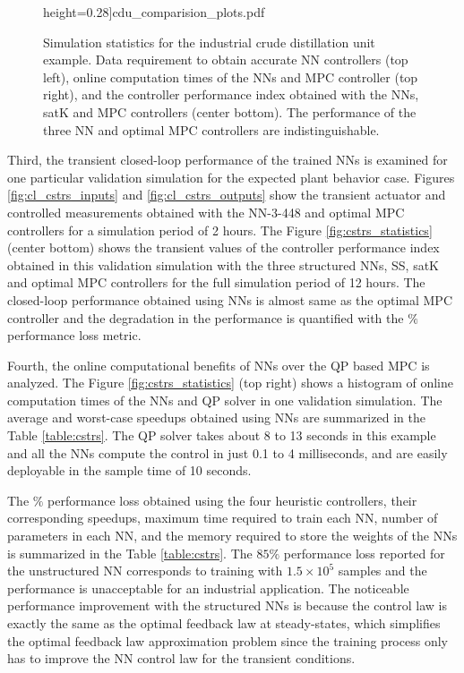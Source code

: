 \documentclass[preprint,5p, twocolumn, authoryear]{elsarticle}
\begin{document}
\begin{figure}[!h]
\begin{center}
        height=0.28\textheight]{cdu_comparision_plots.pdf}\end{center}
    \vspace{-0.2in}
    \caption{Simulation statistics for the industrial crude distillation unit
    example. Data requirement to obtain accurate NN controllers (top left),
    online computation times of the NNs and MPC controller (top right), and the
    controller performance index obtained with the NNs, satK and MPC controllers
    (center bottom). The performance of the three NN and optimal MPC controllers
    are indistinguishable.}	
    \label{fig:cdu_statistics}
\end{figure}

Third, the transient closed-loop performance of the trained NNs is examined for
one particular validation simulation for the expected plant behavior case.
Figures \ref{fig:cl_cstrs_inputs} and \ref{fig:cl_cstrs_outputs} show the
transient actuator and controlled measurements obtained with the NN-3-448 and
optimal MPC controllers for a simulation period of 2 hours. The Figure
\ref{fig:cstrs_statistics} (center bottom) shows the transient values of the
controller performance index obtained in this validation simulation with the
three structured NNs, SS, satK and optimal MPC controllers for the full
simulation period of 12 hours. The closed-loop performance obtained using NNs is
almost same as the optimal MPC controller and the degradation in the performance
is quantified with the $\%$ performance loss metric.

Fourth, the online computational benefits of NNs over the QP based MPC is
analyzed. The Figure \ref{fig:cstrs_statistics} (top right) shows a histogram of
online computation times of the NNs and QP solver in one validation simulation.
The average and worst-case speedups obtained using NNs are summarized in the
Table \ref{table:cstrs}. The QP solver takes about 8 to 13 seconds in this
example and all the NNs compute the control in just 0.1 to 4 milliseconds, and
are easily deployable in the sample time of 10 seconds.

The $\%$ performance loss obtained using the four heuristic controllers, their
corresponding speedups, maximum time required to train each NN, number of
parameters in each NN, and the memory required to store  
the weights of the NNs is summarized in the Table \ref{table:cstrs}. The $85 \%$
performance loss reported for the unstructured NN corresponds to training with
$1.5 \times 10^5$ samples and the performance is unacceptable for an industrial
application. The noticeable performance improvement with the structured NNs is
because the control law is exactly the same as the optimal feedback law at
steady-states, which simplifies the optimal feedback law approximation problem
since the training process only has to improve the NN control law for the
transient conditions. 
\end{document}
